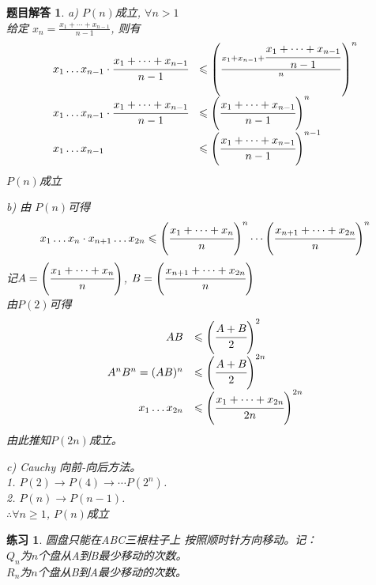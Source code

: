 \documentclass[mode=geye]{elegantnote}
\newtheorem{exercise}{练习}
\newtheorem{answer}{题目解答}
\begin{document}
\begin{answer}
	a) $ P(n) $成立, $ \forall n>1 $\\
	给定 $ x_n = \frac{x_{1}+\cdots+x_{n-1}}{n-1} $, 则有
	\begin{equation*}
		\begin{array}{ll}
			x_1 \dots x_{n-1} \cdot \cfrac{x_{1}+\dots+x_{n-1}}{n-1} 
			&\leqslant \left( \frac{	x_1 + x_{n-1} + \cfrac{x_{1}+\dots+x_{n-1}}{n-1} }{n} \right) ^n \\
			x_1 \dots x_{n-1} \cdot \cfrac{x_{1}+\dots+x_{n-1}}{n-1}
			&\leqslant \left(  \cfrac{x_{1}+\dots+x_{n-1}}{n-1} \right) ^n \\
			x_1 \dots x_{n-1}
			&\leqslant \left(  \cfrac{x_{1}+\dots+x_{n-1}}{n-1} \right) ^{n-1}\\
		\end{array}
	\end{equation*}
	$ P(n) $成立
	
	b) 由 $ P(n) $可得
	\begin{equation*}
		x_{1} \dots x_{n} \cdot x_{n+1} \dots x_{2n} \leqslant \left(\cfrac{x_{1} + \dots + x_{n}}{n}\right)^n \cdots \left(\cfrac{x_{n+1} + \dots + x_{2n}}{n}\right)^n
	\end{equation*}
	记$ A = \left(\cfrac{x_{1} + \dots + x_{n}}{n}\right) $,  $ B = \left(\cfrac{x_{n+1} + \dots + x_{2n}}{n}\right) $\\
	由$ P(2) $可得
	\begin{equation*}
		\begin{array}{rl}
			AB &\leqslant \left(\cfrac{A+B}{2}\right)^{2}  \\
			A^{n} B^{n} = (AB)^{n} &\leqslant \left(\cfrac{A+B}{2}\right)^{2n} \\
			x_{1}\dots x_{2n} &\leqslant \left(\cfrac{x_{1}+\dots +x_{2n}}{2n}\right)^{2n} \\
		\end{array}
	\end{equation*}
	由此推知$ P(2n) $成立。
	
	c) Cauchy 向前-向后方法。\\
	1. $ P(2)\rightarrow P(4)\rightarrow\cdots P(2^n) $. \\
	2. $ P(n)\rightarrow P(n-1) $.\\
	$ \therefore \forall n\geqslant 1 $, $ P(n) $成立
\end{answer}

\begin{exercise}
	圆盘只能在ABC三根柱子上 按照顺时针方向移动。记：\\
	$ Q_{n} $为$ n $个盘从A到B最少移动的次数。\\
	$ R_{n} $为$ n $个盘从B到A最少移动的次数。	
\end{exercise}
\end{document}
